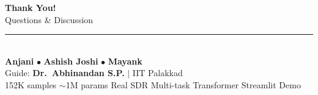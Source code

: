 \documentclass[aspectratio=169, 10pt]{beamer}
\begin{document}
{
\begin{frame}[plain]
\vfill
\begin{center}
  {\Huge\bfseries\color{navy} Thank You!}\\[10pt]
  {\Large\color{royalblue} Questions \& Discussion}\\[12pt]
  \textcolor{royalblue}{\rule{7cm}{1pt}}\\[12pt]
  {\normalsize
    \textbf{Anjani} \;\;$\bullet$\;\;
    \textbf{Ashish Joshi} \;\;$\bullet$\;\;
    \textbf{Mayank}}\\[6pt]
  {\small Guide: \textbf{Dr.\ Abhinandan S.P.} $\mid$ IIT Palakkad}\\[12pt]
  {\small\color{gray}
    152K samples \;\textbar\;
    $\sim$1M params \;\textbar\;
    Real SDR \;\textbar\;
    Multi-task Transformer \;\textbar\;
    Streamlit Demo}
\end{center}
\vfill
\end{frame}
}
\end{document}
